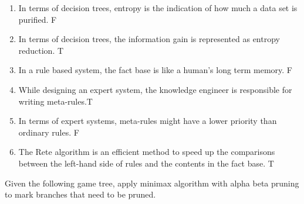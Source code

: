\documentclass[a4paper]{article}
\begin{document}
\begin{enumerate}
		\item In terms of decision trees, entropy is the indication of how much a data set is purified. F
		\item In terms of decision trees, the information gain is represented as entropy reduction. T
		\item In a rule based system, the fact base is like a human's long term memory. F
		\item While designing an expert system, the knowledge engineer is responsible for writing meta-rules.T
		\item In terms of expert systems, meta-rules might have a lower priority than ordinary rules. F
		\item The Rete algorithm is an efficient method to speed up the comparisons between the left-hand side of rules and the contents in the fact base. T
	\end{enumerate}
	Given the following game tree, apply minimax algorithm with alpha beta pruning to mark branches that need to be pruned. 
\end{document}
